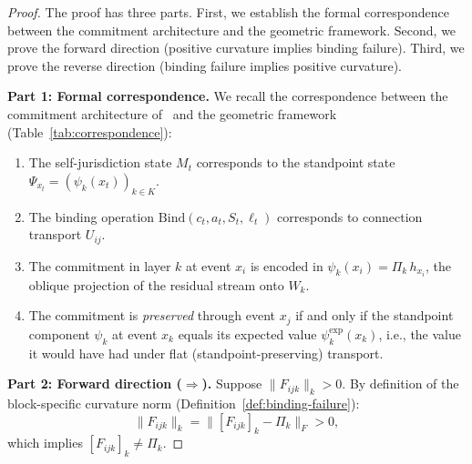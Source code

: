 \begin{proof}
The proof has three parts. First, we establish the formal correspondence between the
commitment architecture and the geometric framework. Second, we prove the forward direction
(positive curvature implies binding failure). Third, we prove the reverse direction (binding
failure implies positive curvature).

\medskip\noindent\textbf{Part 1: Formal correspondence.}
We recall the correspondence between the commitment architecture of~\cite{self-jurisdiction}
and the geometric framework (Table~\ref{tab:correspondence}):
\begin{enumerate}
    \item The self-jurisdiction state $M_t$ corresponds to the standpoint state $\Psi_{x_t}
    = (\psi_k(x_t))_{k \in K}$.
    \item The binding operation $\mathrm{Bind}(c_t, a_t, S_t, \ell_t)$ corresponds to
    connection transport $U_{ij}$.
    \item The commitment in layer $k$ at event $x_i$ is encoded in $\psi_k(x_i) =
    \Pi_k\, h_{x_i}$, the oblique projection of the residual stream onto $W_k$.
    \item The commitment is \emph{preserved} through event $x_j$ if and only if the
    standpoint component $\psi_k$ at event $x_k$ equals its expected value
    $\psi_k^{\exp}(x_k)$, i.e., the value it would have had under flat (standpoint-preserving)
    transport.
\end{enumerate}

\medskip\noindent\textbf{Part 2: Forward direction ($\Rightarrow$).}
Suppose $\|F_{ijk}\|_k > 0$. By definition of the block-specific curvature norm
(Definition~\ref{def:binding-failure}):
\[
    \|F_{ijk}\|_k = \big\|[F_{ijk}]_k - \Pi_k\big\|_F > 0,
\]
which implies $[F_{ijk}]_k \neq \Pi_k$.


\end{proof}
